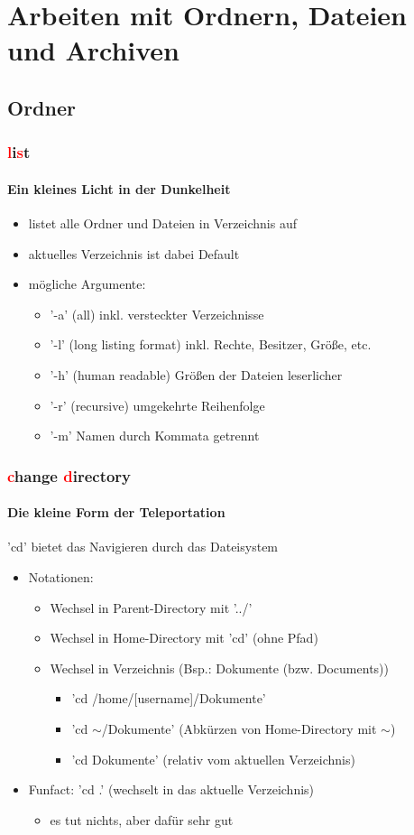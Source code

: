 \documentclass[12pt,utf8]{beamer}
\begin{document}

\section{Arbeiten mit Ordnern, Dateien und Archiven}
\subsection{Ordner}
\begin{frame}
\frametitle{\textcolor{red}{l}i\textcolor{red}{s}t}
\framesubtitle{Ein kleines Licht in der Dunkelheit}
\begin{itemize}
	\item listet alle Ordner und Dateien in Verzeichnis auf
	\item aktuelles Verzeichnis ist dabei Default
	\item mögliche Argumente:
	\begin{itemize}[<+->]
		\item '-a'  (all) inkl. versteckter Verzeichnisse
		\item '-l'  (long listing format) inkl. Rechte, Besitzer, Größe, etc.
		\item '-h'  (human readable) Größen der Dateien leserlicher
		\item '-r'  (recursive) umgekehrte Reihenfolge
		\item '-m'  Namen durch Kommata getrennt
	\end{itemize}
\end{itemize}
\end{frame}

\begin{frame}
\frametitle{\textcolor{red}{c}hange \textcolor{red}{d}irectory}
\framesubtitle{Die kleine Form der Teleportation}
'cd' bietet das Navigieren durch das Dateisystem
\begin{itemize}[<+->]
	\item Notationen:	
	\begin{itemize}[<+->]
		\item Wechsel in Parent-Directory mit '../'
		\item Wechsel in Home-Directory mit 'cd'   (ohne Pfad)
		\item Wechsel in Verzeichnis (Bsp.: Dokumente (bzw. Documents))
		\begin{itemize}[<+->]
			\item 'cd /home/[username]/Dokumente'
			\item 'cd $\sim$/Dokumente'   (Abkürzen von Home-Directory mit $\sim$)
			\item 'cd Dokumente'    (relativ vom aktuellen Verzeichnis)
		\end{itemize}
	\end{itemize}
	\item Funfact: 'cd .'  (wechselt in das aktuelle Verzeichnis)
	\begin{itemize}
		\item es tut nichts, aber dafür sehr gut
	\end{itemize}
\end{itemize}
\end{frame}
\end{document}
